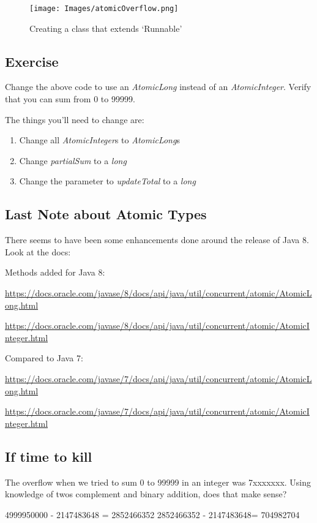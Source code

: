 \documentclass[12pt]{article}
\begin{document}
\begin{figure}[ht]
  \label{atomicInt}
  \centering
    \texttt{[image: Images/atomicOverflow.png]}
  \caption{Creating a class that extends `Runnable'}
\end{figure}



\subsection{Exercise}
Change the above code to use an \textit{AtomicLong} instead of an
\textit{AtomicInteger}. Verify that you can sum from 0 to 99999.

The things you'll need to change are:
\begin{enumerate}
\item Change all \textit{AtomicInteger}s to \textit{AtomicLong}s
\item Change \textit{partialSum} to a \textit{long}
\item Change the parameter to \textit{updateTotal} to a \textit{long}
\end{enumerate}

\subsection{Last Note about Atomic Types}
There seems to have been some enhancements done around the release of Java 8.
Look at the docs:

Methods added for Java 8:

\url{https://docs.oracle.com/javase/8/docs/api/java/util/concurrent/atomic/AtomicLong.html}

\url{https://docs.oracle.com/javase/8/docs/api/java/util/concurrent/atomic/AtomicInteger.html}

Compared to Java 7:

\url{https://docs.oracle.com/javase/7/docs/api/java/util/concurrent/atomic/AtomicLong.html}

\url{https://docs.oracle.com/javase/7/docs/api/java/util/concurrent/atomic/AtomicInteger.html}

\subsection{If time to kill}
The overflow when we tried to sum 0 to 99999 in an integer was 7xxxxxxx. Using
knowledge of twos complement and binary addition, does that make sense?

4999950000 - 2147483648 = 2852466352
2852466352 - 2147483648= 704982704
\end{document}
